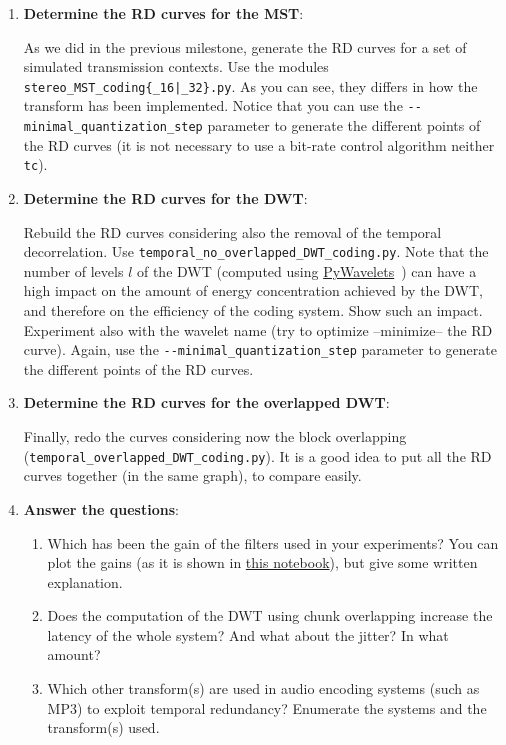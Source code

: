 \begin{enumerate}

\item \textbf{Determine the RD curves for the MST}:
  
As we did in the previous milestone, generate the RD curves for a set
of simulated transmission contexts. Use the modules
\texttt{stereo\_MST\_coding\{\_16|\_32\}.py}. As you can see, they
differs in how the transform has been implemented.  Notice that you
can use the \verb|--minimal_quantization_step| parameter to generate
the different points of the RD curves (it is not necessary to use a
bit-rate control algorithm neither \texttt{tc}).

\item \textbf{Determine the RD curves for the DWT}:

  Rebuild the RD curves considering also the removal of the temporal
  decorrelation. Use \verb|temporal_no_overlapped_DWT_coding.py|. Note
  that the number of levels $l$ of the DWT (computed using
  \href{https://pywavelets.readthedocs.io/en/latest/}{PyWavelets}~\cite{lee2019pywavelets})
  can have a high impact on the amount of energy concentration
  achieved by the DWT, and therefore on the efficiency of the coding
  system. Show such an impact. Experiment also with the wavelet name
  (try to optimize --minimize-- the RD curve). Again, use the
  \verb|--minimal_quantization_step| parameter to generate the
  different points of the RD curves.


\item \textbf{Determine the RD curves for the overlapped DWT}:

Finally, redo the curves considering now the block overlapping
(\verb|temporal_overlapped_DWT_coding.py|). It is a good idea to put
all the RD curves together (in the same graph), to compare easily.


\item \textbf{Answer the questions}:

\begin{enumerate}
  
\item Which has been the gain of the filters used in your experiments?
  You can plot the gains (as it is shown in
  \href{https://github.com/Tecnologias-multimedia/InterCom/blob/master/docs/2-hours_seminar.ipynb}{this
    notebook}), but give some written explanation.

\item Does the computation of the DWT using chunk overlapping increase
  the latency of the whole system? And what about the jitter? In what amount?

\item Which other transform(s) are used in audio encoding systems
  (such as MP3) to exploit temporal redundancy? Enumerate the
  systems and the transform(s) used.

\end{enumerate}

\end{enumerate}

